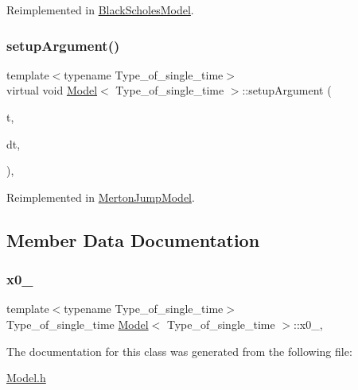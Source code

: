 Reimplemented in \hyperlink{class_black_scholes_model_a04a6ba4c59cd70a92dedbeb482e9d5aa}{Black\+Scholes\+Model}.

\hypertarget{class_model_a603717845fc9c6317d65a39409d10aed}{}\label{class_model_a603717845fc9c6317d65a39409d10aed} 
\subsubsection{\texorpdfstring{setup\+Argument()}{setupArgument()}\hspace{0.1cm}{\footnotesize\ttfamily [2/2]}}
{\footnotesize\ttfamily template$<$typename Type\+\_\+of\+\_\+single\+\_\+time$>$ \\
virtual void \hyperlink{class_model}{Model}$<$ Type\+\_\+of\+\_\+single\+\_\+time $>$\+::setup\+Argument (\begin{DoxyParamCaption}\item[{\hyperlink{_name_def_8h_ac2d3e0ba793497bcca555c7c2cf64ff3}{Time}}]{t,  }\item[{\hyperlink{_name_def_8h_ac2d3e0ba793497bcca555c7c2cf64ff3}{Time}}]{dt,  }\item[{vector$<$ \hyperlink{class_generic_random_variable_generator_1_1_argument}{Generic\+Random\+Variable\+Generator\+::\+Argument} $\ast$$>$}]{ }\end{DoxyParamCaption})\hspace{0.3cm}{\ttfamily [inline]}, {\ttfamily [virtual]}}



Reimplemented in \hyperlink{class_merton_jump_model_aaa2a274f47e3d70b4e331df023855ddc}{Merton\+Jump\+Model}.



\subsection{Member Data Documentation}
\hypertarget{class_model_a8b547d019a51a21f539209227fbde146}{}\label{class_model_a8b547d019a51a21f539209227fbde146} 
\subsubsection{\texorpdfstring{x0\+\_\+}{x0\_}}
{\footnotesize\ttfamily template$<$typename Type\+\_\+of\+\_\+single\+\_\+time$>$ \\
Type\+\_\+of\+\_\+single\+\_\+time \hyperlink{class_model}{Model}$<$ Type\+\_\+of\+\_\+single\+\_\+time $>$\+::x0\+\_\+\hspace{0.3cm}{\ttfamily [mutable]}, {\ttfamily [protected]}}



The documentation for this class was generated from the following file\+:\begin{DoxyCompactItemize}
\item 
\hyperlink{_model_8h}{Model.\+h}\end{DoxyCompactItemize}
